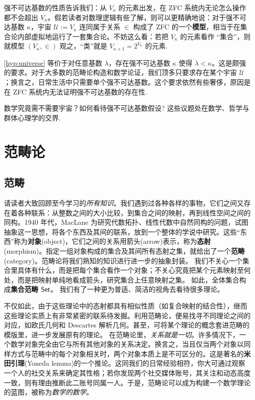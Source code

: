 强不可达基数的性质告诉我们：从 $V_\kappa$ 的元素出发，在 ZFC 系统内无论怎么操作都不会超出 $V_\kappa$。假若读者对数理逻辑有些了解，则可以更精确地说：对于强不可达基数 $\kappa$，宇宙 $\mathcal{U} := V_\kappa$ 连同属于关系 $\in$ 构成了 ZFC 的一个\textbf{模型}，相当于在集合论内部虚拟地运行了一套集合论。不妨这么看：若把 $V_\kappa$ 的元素看作 “集合”，则就模型 $(V_\kappa,\in)$ 观之，“类”就是 $V_{\kappa+1} = 2^{V_\kappa}$ 的元素.

\begin{remark}
	\ref{hyp:universe} 等价于对任意基数 $\lambda$，存在强不可达基数 $\kappa$ 使得 $\lambda < \kappa$。这是颇强的要求。对于大多数的范畴论构造和数学论证，我们顶多只要求存在某个宇宙 $\mathcal{U}$；换言之，日常生活中只需要单个强不可达基数。这个要求依然有些奢侈，原因是在 ZFC 系统内无法证明强不可达基数的存在性.
\end{remark}

数学究竟需不需要宇宙？如何看待强不可达基数假设? 这些议题处在数学、哲学与群体心理学的交界.

\section{范畴论}
\subsection{范畴}
请读者大致回顾至今学习的\emph{所有知识}。我们遇到过各种各样的事物，它们之间又存在着各种联系：从整数之间的大小比较，到集合之间的映射，再到线性空间之间的同构。1940 年代，MacLane 为研究代数拓扑、线性代数中自然同构的问题，试图抽象这一思想，将各个东西及其间的联系，放到一个整体的学说中研究。这些“东西”称为\textbf{对象}(object)，它们之间的关系用箭头(arrow)表示，称为\textbf{态射}(morphism)。指定一组对象构成的集合及其间所有态射之集，就给出了一个\textbf{范畴}(category)。范畴论将我们熟知的知识进行进一步的抽象封装。
我们不关心一个集合里具体有什么，而是把每个集合看作一个对象；不关心究竟把某个元素映射至何处，而是把映射单纯地看成箭头，研究集合上任意映射之集。
如此，全体集合构成\textbf{集合范畴} $\mathsf{Set}$。
我们有了一种更为普适、简洁的视角去看待很多理论。

不仅如此，由于这些理论中的态射都具有相似性质（如复合映射的结合性），继而这些理论实质上有非常紧密的联系待发掘。利用范畴论，便易找寻不同理论之间的对应，如欧氏几何和 Descartes 解析几何。甚至，可将某个理论的概念套进范畴的模版里，进一步发展原有的理论。
在范畴论里，\emph{关系就是一切}。许多情况下，一个数学对象完全由它与所有其他对象的关系决定。换言之，当且仅当两个对象以同样方式与范畴中的每个对象相关时，两个对象本质上是不可区分的。这是著名的\textbf{米田引理}(Yoneda lemma)的一个推论。这同我们的日常经验相符，你大可通过观察一个人的社交关系来确定其性格；若你发现两个社交媒体账号，其关注和动态高度一致，则有理由推断此二账号同属一人。于是，范畴论可以成为构建一个数学理论的蓝图，被称为\emph{数学的数学}。

